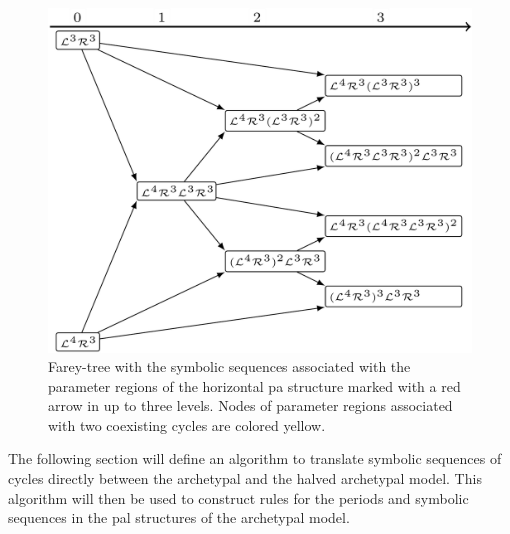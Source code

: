 \begin{figure}
	\centering
	\includegraphics[width=.7 \textwidth]{../Figures/7/7.20/adding.png}
	\caption[Farey-tree with the symbolic sequences of a horizontal  structure]{
		Farey-tree with the symbolic sequences associated with the parameter regions of the horizontal \gls{pa} structure marked with a red arrow in  up to three levels.
		Nodes of parameter regions associated with two coexisting cycles are colored yellow.
	}
	\label{fig:halved.hor.tree}
\end{figure}

The following section will define an algorithm to translate symbolic sequences of cycles directly between the archetypal and the halved archetypal model.
This algorithm will then be used to construct rules for the periods and symbolic sequences in the \gls{pal} structures of the archetypal model.

